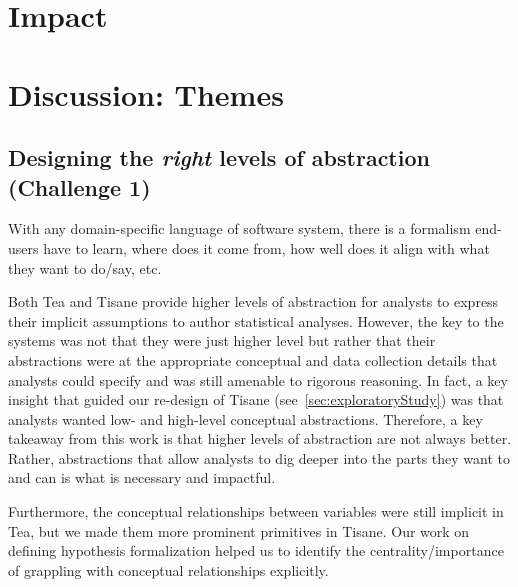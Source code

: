 \section{Impact}

\section{Discussion: Themes}

\subsection{Designing the \textit{right} levels of abstraction (Challenge 1)} 
With any domain-specific language of software system, there is a formalism
end-users have to learn, where does it come from, how well does it align with
what they want to do/say, etc. 

Both Tea and Tisane provide higher levels of abstraction for analysts to express
their implicit assumptions to author statistical analyses. However, the key to
the systems was not that they were just higher level but rather that their
abstractions were at the appropriate conceptual and data collection details that
analysts could specify and was still amenable to rigorous reasoning. In fact, a
key insight that guided our re-design of Tisane
(see~\autoref{sec:exploratoryStudy}) was that analysts wanted low- and
high-level conceptual abstractions. Therefore, a key takeaway from this work is
that higher levels of abstraction are not always better. Rather, abstractions
that allow analysts to dig deeper into the parts they want to and can is what is
necessary and impactful. 

Furthermore, the conceptual relationships between variables were still implicit
in Tea, but we made them more prominent primitives in Tisane. Our work on
defining hypothesis formalization helped us to identify the
centrality/importance of grappling with conceptual relationships explicitly. 


